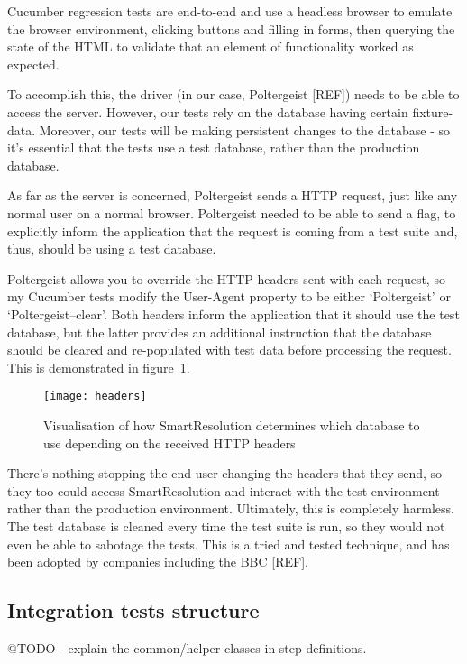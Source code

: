 Cucumber regression tests are end-to-end and use a headless browser to emulate the browser environment, clicking buttons and filling in forms, then querying the state of the HTML to validate that an element of functionality worked as expected.

To accomplish this, the driver (in our case, Poltergeist [REF]) needs to be able to access the server. However, our tests rely on the database having certain fixture-data. Moreover, our tests will be making persistent changes to the database - so it's essential that the tests use a test database, rather than the production database.

As far as the server is concerned, Poltergeist sends a HTTP request, just like any normal user on a normal browser. Poltergeist needed to be able to send a flag, to explicitly inform the application that the request is coming from a test suite and, thus, should be using a test database.

Poltergeist allows you to override the HTTP headers sent with each request, so my Cucumber tests modify the User-Agent property to be either `Poltergeist' or `Poltergeist--clear'. Both headers inform the application that it should use the test database, but the latter provides an additional instruction that the database should be cleared and re-populated with test data before processing the request. This is demonstrated in figure~\ref{uml:headers}.

\begin{figure}[h!]
  \centering
    \ifimages
    \texttt{[image: headers]}
    \fi
  \caption{Visualisation of how SmartResolution determines which database to use depending on the received HTTP headers}
  \label{uml:headers}
\end{figure}

There's nothing stopping the end-user changing the headers that they send, so they too could access SmartResolution and interact with the test environment rather than the production environment. Ultimately, this is completely harmless. The test database is cleaned every time the test suite is run, so they would not even be able to sabotage the tests. This is a tried and tested technique, and has been adopted by companies including the BBC [REF].

\subsection{Integration tests structure}

@TODO - explain the common/helper classes in step definitions.

